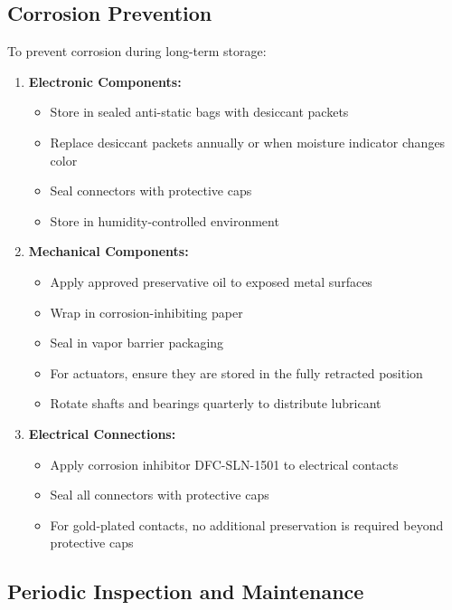 \documentclass[12pt,a4paper,twoside,openright]{book}
\begin{document}
\subsection{Corrosion Prevention}

To prevent corrosion during long-term storage:

\begin{enumerate}
    \item \textbf{Electronic Components:}
    \begin{itemize}
        \item Store in sealed anti-static bags with desiccant packets
        \item Replace desiccant packets annually or when moisture indicator changes color
        \item Seal connectors with protective caps
        \item Store in humidity-controlled environment
    \end{itemize}
    
    \item \textbf{Mechanical Components:}
    \begin{itemize}
        \item Apply approved preservative oil to exposed metal surfaces
        \item Wrap in corrosion-inhibiting paper
        \item Seal in vapor barrier packaging
        \item For actuators, ensure they are stored in the fully retracted position
        \item Rotate shafts and bearings quarterly to distribute lubricant
    \end{itemize}
    
    \item \textbf{Electrical Connections:}
    \begin{itemize}
        \item Apply corrosion inhibitor DFC-SLN-1501 to electrical contacts
        \item Seal all connectors with protective caps
        \item For gold-plated contacts, no additional preservation is required beyond protective caps
    \end{itemize}
\end{enumerate}

\subsection{Periodic Inspection and Maintenance}
\end{document}
